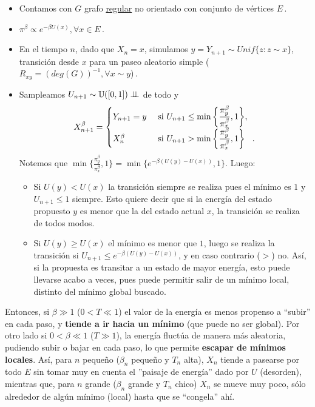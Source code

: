 \begin{itemize}
    \item Contamos con $G$ grafo \underline{regular} no orientado con conjunto de v\'ertices $E$\,.
    \item $\pi^\beta \propto e^{-\beta U(x)}, \forall x \in E$\,.
    \item En el tiempo $n$, dado que $X_n=x$, simulamos
    $ y=Y_{n+1}\sim Unif\{z:z\sim x\}$, transición desde $x$ para un paseo aleatorio simple ($R_{xy}=(deg(G))^{-1}, \forall x\sim y$)\,.
    \item Sampleamos $U_{n+1}\sim\mathbb{U}([0,1]) \perp \!\!\! \perp$ de todo y 
    $$ X_{n+1}^\beta =\begin{cases}
    Y_{n+1}=y  & \mbox{ si } U_{n+1}\leq\displaystyle\min\bigg\{\displaystyle\frac{\pi_y^\beta}{\pi_x^\beta},1\bigg\} , \\
    X_n^\beta  & \mbox{ si } U_{n+1}>\min\bigg\{\displaystyle\frac{\pi_y^\beta}{\pi_x^\beta},1\bigg\}\hspace{.25cm}\,.
    \end{cases}$$
    Notemos que  $\min\bigg\{\displaystyle\frac{\pi_y^\beta}{\pi_x^\beta},1\bigg\} = \min \{ e^{-\beta(U(y)-U(x))},1\}$. Luego: 
    \begin{itemize}
        \item Si $U(y)<U(x)$ la transición siempre se realiza pues  el m\'inimo es $1$ y $U_{n+1}\leq 1$ siempre. Esto quiere decir que si la energía del estado propuesto $y$ es menor que la del estado actual $x$, la transición se realiza de todos modos.
        \item Si $U(y)\geq U(x)$  el m\'inimo es menor que $1$, luego se realiza la transici\'on si  $U_{n+1}\leq e^{-\beta(U(y)-U(x))}$, y en caso contrario ($>$) no. As\'i, si la propuesta es transitar a un estado de mayor energía, esto puede llevarse acabo a veces,  pues puede permitir salir de un mínimo local, distinto del mínimo  global buscado.
    \end{itemize}
\end{itemize}
Entonces,  si $\beta\gg 1 $ ($0<T\ll  1 $) el valor de la energ\'ia es menos propenso a ``subir'' en cada paso, y \textbf{tiende a ir hacia un m\'inimo}  (que puede no ser global). Por otro lado si $0<\beta\ll  1$ ($T\gg 1$),  la energ\'ia fluct\'ua de manera más aleatoria, pudiendo  subir o bajar en cada paso, lo que permite \textbf{escapar de mínimos locales}.
\newp Así, para $n$ pequeño ($\beta_n$ pequeño y $T_n$ alta), $X_n$ tiende a pasearse por todo $E$ sin tomar muy en cuenta el ''paisaje de energ\'ia'' dado por $U$ (desorden), mientras que, para $n$ grande ($\beta_n$ grande y $T_n$ chico) $X_n$ se mueve muy poco, sólo alrededor de algún mínimo (local) hasta que se ``congela'' ahí. 

